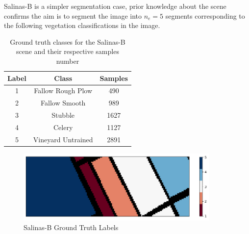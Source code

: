 Salinas-B is a simpler segmentation case, prior knowledge about the scene confirms the aim is to segment the image into $n_e = 5$ segments corresponding to the following vegetation classifications in the image.
\begin{table}[H]
    \centering
    \label{tab:salinas_b_classes}
    \begin{tabular}{|c|c|c|}
    \hline
    \textbf{Label} & \textbf{Class} & \textbf{Samples} \\
    \hline
    1 & Fallow Rough Plow & 490 \\
    2 & Fallow Smooth & 989 \\
    3 & Stubble & 1627 \\
    4 & Celery & 1127 \\
    5 & Vineyard Untrained  & 2891 \\
    \hline
    \end{tabular}
    \caption{Ground truth classes for the Salinas-B scene and their respective samples number}
\end{table}
\begin{figure}[H]
    \centering
    \includegraphics[width=10cm]{salinas-b-gt.png}  %
    \caption{Salinas-B Ground Truth Labels}
    \label{salina-b}  %
\end{figure}


